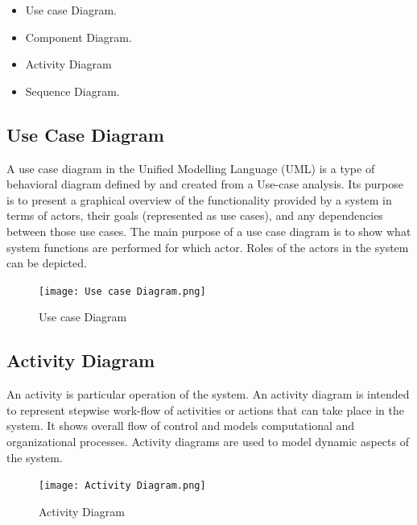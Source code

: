 \documentclass[12pt]{report}
\begin{document}
\begin{itemize}
\item Use case Diagram.

\item Component Diagram.

\item Activity Diagram

\item  Sequence Diagram.

\end{itemize}

\clearpage


\justifying
\setlength{\parindent}{4em}
\setlength{\parskip}{0.5em}
\renewcommand{\baselinestretch}{1.5}
\normalsize
\subsection{Use Case Diagram}
A use case diagram in the Unified Modelling Language (UML) is a type of behavioral
diagram defined by and created from a Use-case analysis. Its purpose is to present a graphical 
overview of the functionality provided by a system in terms of actors, their goals 
(represented as use cases), and any dependencies between those use cases. The main purpose 
of a use case diagram is to show what system functions are performed for which actor. Roles 
of the actors in the system can be depicted.


\vspace{1.5cm}
\begin{figure}[h]
\centering
\texttt{[image: Use case Diagram.png]}
\caption{Use case Diagram}
\label{ Use case Diagram}
\end{figure}

\justifying
\setlength{\parindent}{4em}
\setlength{\parskip}{0.5em}
\renewcommand{\baselinestretch}{1.5}
\normalsize
\subsection{Activity Diagram}
An activity is particular operation of the system. An activity diagram is intended to represent
stepwise work-flow of activities or actions that can take place in the system. It shows overall
flow of control and models computational and organizational processes. Activity diagrams
are used to model dynamic aspects of the system. 

\vspace{1.5cm}
\begin{figure}[h]
\centering
\texttt{[image: Activity Diagram.png]}
\caption{Activity Diagram}
\label{Activity Diagram}
\end{figure}
\end{document}
